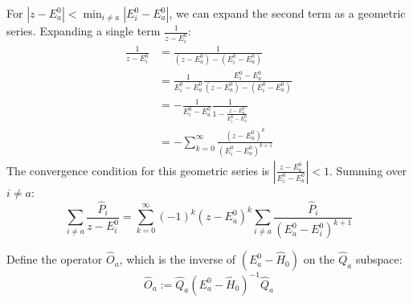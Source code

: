 For $|z-E_a^0|<\min_{i\neq a}|E_i^0-E_a^0|$, we can expand the second
term as a geometric series. Expanding a single term $\frac{1}{z-E_i^0}$:
\begin{align} \label{eq:geometric_series_expansion}
    \frac{1}{z-E_i^0}
    &= \frac{1}{(z-E_a^0) - (E_i^0 - E_a^0)} \\
    &= \frac{1}{E_i^0 - E_a^0} \frac{E_i^0 - E_a^0}{(z-E_a^0) -
    (E_i^0 - E_a^0)} \\
    &= -\frac{1}{E_i^0 - E_a^0} \frac{1}{1-\frac{z-E_a^0}{E_i^0-E_a^0}} \\
    &= -\sum_{k=0}^\infty \frac{(z-E_a^0)^k}{(E_i^0-E_a^0)^{k+1}}
\end{align}
The convergence condition for this geometric series is
$\left|\frac{z-E_a^0}{E_i^0-E_a^0}\right| < 1$.
Summing over $i \ne a$:
\begin{equation} \label{eq:G0_sum_expansion}
    \sum_{i\neq a}\frac{\hat P_i}{z-E_i^0}
    =\sum_{k=0}^\infty (-1)^k (z-E_a^0)^k
    \sum_{i\neq a}\frac{\hat P_i}{(E_a^0-E_i^0)^{k+1}}
\end{equation}

\begin{definition}
    Define the operator $\hat O_a$, which is the inverse of $(E_a^0 -
    \hat H_0)$ on the $\hat Q_a$ subspace:
    \begin{equation} \label{eq:kato_operator_O_a_definition}
        \hat O_a := \hat Q_a (E_a^0 - \hat H_0)^{-1} \hat Q_a
    \end{equation}
\end{definition}

